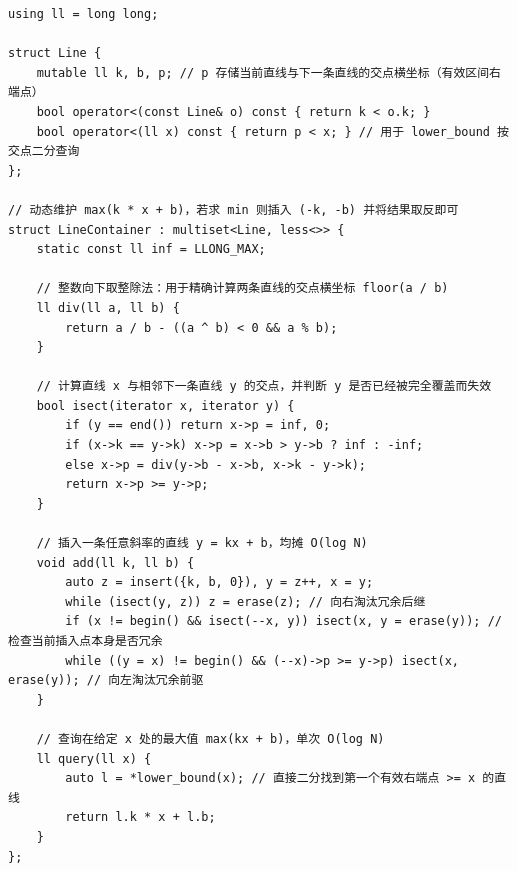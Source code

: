 \begin{lstlisting}
using ll = long long;

struct Line {
    mutable ll k, b, p; // p 存储当前直线与下一条直线的交点横坐标（有效区间右端点）
    bool operator<(const Line& o) const { return k < o.k; }
    bool operator<(ll x) const { return p < x; } // 用于 lower_bound 按交点二分查询
};

// 动态维护 max(k * x + b)，若求 min 则插入 (-k, -b) 并将结果取反即可
struct LineContainer : multiset<Line, less<>> {
    static const ll inf = LLONG_MAX;

    // 整数向下取整除法：用于精确计算两条直线的交点横坐标 floor(a / b)
    ll div(ll a, ll b) {
        return a / b - ((a ^ b) < 0 && a % b);
    }

    // 计算直线 x 与相邻下一条直线 y 的交点，并判断 y 是否已经被完全覆盖而失效
    bool isect(iterator x, iterator y) {
        if (y == end()) return x->p = inf, 0;
        if (x->k == y->k) x->p = x->b > y->b ? inf : -inf;
        else x->p = div(y->b - x->b, x->k - y->k);
        return x->p >= y->p;
    }

    // 插入一条任意斜率的直线 y = kx + b，均摊 O(log N)
    void add(ll k, ll b) {
        auto z = insert({k, b, 0}), y = z++, x = y;
        while (isect(y, z)) z = erase(z); // 向右淘汰冗余后继
        if (x != begin() && isect(--x, y)) isect(x, y = erase(y)); // 检查当前插入点本身是否冗余
        while ((y = x) != begin() && (--x)->p >= y->p) isect(x, erase(y)); // 向左淘汰冗余前驱
    }

    // 查询在给定 x 处的最大值 max(kx + b)，单次 O(log N)
    ll query(ll x) {
        auto l = *lower_bound(x); // 直接二分找到第一个有效右端点 >= x 的直线
        return l.k * x + l.b;
    }
};
\end{lstlisting}
